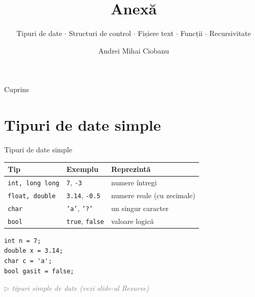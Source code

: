 ﻿\documentclass{beamer}
\title{Anexă}
\subtitle{Tipuri de date $\cdot$ Structuri de control $\cdot$ Fișiere text $\cdot$ Funcții $\cdot$ Recursivitate}
\author{Andrei Mihai Ciobanu}
\institute{Algolymp Summer School}
\date{}
\newcommand{\beginnote}[1]{%
  \vfill
  {\footnotesize\textcolor{gray}{\textit{$\triangleright$ #1 (vezi slide-ul \emph{Resurse})}}}%
}
\begin{document}
\begin{frame}[shrink]
  \titlepage
\end{frame}

\begin{frame}{Cuprins}
  \tableofcontents
\end{frame}

\section{Tipuri de date simple}

\begin{frame}[fragile]{Tipuri de date simple}
  \begin{center}
  \begin{tabular}{llp{4.5cm}}
    \toprule
    Tip & Exemplu & Reprezintă \\
    \midrule
    \texttt{int, long long}    & \texttt{7}, \texttt{-3}       & numere întregi \\
    \texttt{float,   double} & \texttt{3.14}, \texttt{-0.5}  & numere reale (cu zecimale) \\
    \texttt{char}   & \texttt{'a'}, \texttt{'?'}    & un singur caracter \\
    \texttt{bool}   & \texttt{true}, \texttt{false} & valoare logică \\
    \bottomrule
  \end{tabular}
  \end{center}

  \smallskip
  \begin{lstlisting}
int n = 7;
double x = 3.14;
char c = 'a';
bool gasit = false;
  \end{lstlisting}
  \beginnote{tipuri simple de date}
\end{frame}
\end{document}
